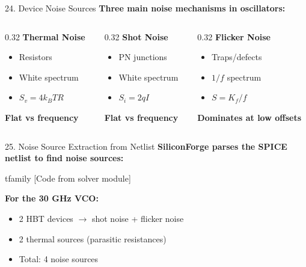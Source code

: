 \documentclass[aspectratio=169, 11pt]{beamer}
\begin{document}
\begin{frame}{24. Device Noise Sources}
    \textbf{Three main noise mechanisms in oscillators:}

    \vspace{0.5em}
    \begin{columns}[T]
        \begin{column}{0.32\textwidth}
            \textbf{Thermal Noise}
            \begin{itemize}
                \item Resistors
                \item White spectrum
                \item $S_v = 4k_BTR$
            \end{itemize}
            \textcolor{myblue}{\textbf{Flat vs frequency}}
        \end{column}
        \begin{column}{0.32\textwidth}
            \textbf{Shot Noise}
            \begin{itemize}
                \item PN junctions
                \item White spectrum
                \item $S_i = 2qI$
            \end{itemize}
            \textcolor{mygreen}{\textbf{Flat vs frequency}}
        \end{column}
        \begin{column}{0.32\textwidth}
            \textbf{Flicker Noise}
            \begin{itemize}
                \item Traps/defects
                \item $1/f$ spectrum
                \item $S = K_f/f$
            \end{itemize}
            \textcolor{myorange}{\textbf{Dominates at low offsets}}
        \end{column}
    \end{columns}
\end{frame}

\begin{frame}{25. Noise Source Extraction from Netlist}
    \textbf{SiliconForge parses the SPICE netlist to find noise sources:}

    \vspace{0.5em}
    {	tfamily [Code from solver module]}

    \vspace{0.5em}
    \textbf{For the 30 GHz VCO:}
    \begin{itemize}
        \item 2 HBT devices $\rightarrow$ shot noise + flicker noise
        \item 2 thermal sources (parasitic resistances)
        \item Total: 4 noise sources
    \end{itemize}
\end{frame}
\end{document}
